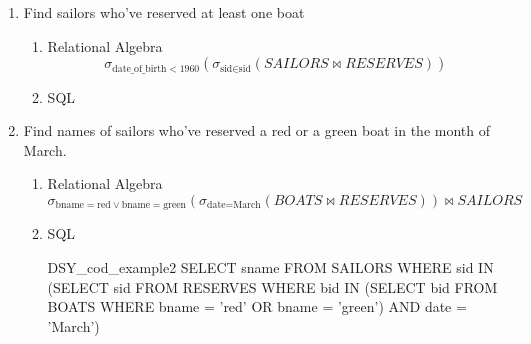 \begin{enumerate}
    \item  Find sailors who've reserved at least one boat
          \begin{enumerate}
              \item Relational Algebra
                    \begin{equation*}
                        \sigma_{\text{date\_of\_birth} < 1960}(\sigma_{\text{sid} \in \text{sid}}(SAILORS \bowtie RESERVES))
                    \end{equation*}

              \item  SQL \linebreak {}
          \end{enumerate}
          \vspace{1cm}

    \item Find names of sailors who've reserved a red or a green boat in the month of March.
          \begin{enumerate}
              \item Relational Algebra
                    \begin{equation*}
                        \sigma_{\text{bname} = \text{red} \lor \text{bname} = \text{green}}(\sigma_{\text{date} = \text{March}}(BOATS \bowtie RESERVES)) \bowtie SAILORS
                    \end{equation*}
                    \pagebreak

              \item  SQL
                    \begin{sqlQuery}{DSY_cod_example2}
                        SELECT sname
                        FROM SAILORS
                        WHERE sid IN
                            (SELECT sid
                            FROM RESERVES
                            WHERE bid IN
                                (SELECT bid
                                FROM BOATS
                                WHERE bname = 'red' OR bname = 'green')
                            AND date = 'March')
                    \end{sqlQuery}

          \end{enumerate}
\end{enumerate}


\pagebreak